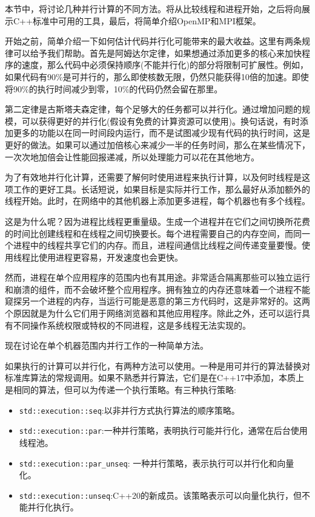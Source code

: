 
本节中，将讨论几种并行计算的不同方法。将从比较线程和进程开始，之后将向展示C++标准中可用的工具，最后，将简单介绍OpenMP和MPI框架。

开始之前，简单介绍一下如何估计代码并行化可能带来的最大收益。这里有两条规律可以给予我们帮助。首先是阿姆达尔定律，如果想通过添加更多的核心来加快程序的速度，那么代码中必须保持顺序(不能并行化)的部分将限制可扩展性。例如，如果代码有90\%是可并行的，那么即使核数无限，仍然只能获得10倍的加速。即使将90\%的执行时间减少到零，10\%的代码仍然会留在那里。

第二定律是古斯塔夫森定律，每个足够大的任务都可以并行化。通过增加问题的规模，可以获得更好的并行化(假设有免费的计算资源可以使用)。换句话说，有时添加更多的功能以在同一时间段内运行，而不是试图减少现有代码的执行时间，这是更好的做法。如果可以通过加倍核心来减少一半的任务时间，那么在某些情况下，一次次地加倍会让性能回报递减，所以处理能力可以花在其他地方。


为了有效地并行化计算，还需要了解何时使用进程来执行计算，以及何时线程是这项工作的更好工具。长话短说，如果目标是实际并行工作，那么最好从添加额外的线程开始。此时，在网络中的其他机器上添加更多进程，每个机器也有多个线程。

这是为什么呢？因为进程比线程更重量级。生成一个进程并在它们之间切换所花费的时间比创建线程和在线程之间切换要长。每个进程需要自己的内存空间，而同一个进程中的线程共享它们的内存。而且，进程间通信比线程之间传递变量要慢。使用线程比使用进程更容易，开发速度也会更快。

然而，进程在单个应用程序的范围内也有其用途。非常适合隔离那些可以独立运行和崩溃的组件，而不会破坏整个应用程序。拥有独立的内存还意味着一个进程不能窥探另一个进程的内存，当运行可能是恶意的第三方代码时，这是非常好的。这两个原因就是为什么它们用于网络浏览器和其他应用程序。除此之外，还可以运行具有不同操作系统权限或特权的不同进程，这是多线程无法实现的。

现在讨论在单个机器范围内并行工作的一种简单方法。


如果执行的计算可以并行化，有两种方法可以使用。一种是用可并行的算法替换对标准库算法的常规调用。如果不熟悉并行算法，它们是在C++17中添加，本质上是相同的算法，但可以为传递一个执行策略。有三种执行策略:

\begin{itemize}
\item 
\texttt{std::execution::seq}:以非并行方式执行算法的顺序策略。

\item
\texttt{std::execution::par}:一种并行策略，表明执行可能并行化，通常在后台使用线程池。

\item
\texttt{std::execution::par\_unseq}: 一种并行策略，表示执行可以并行化和向量化。

\item
\texttt{std::execution::unseq}:C++20的新成员。该策略表示可以向量化执行，但不能并行化执行。
\end{itemize}

